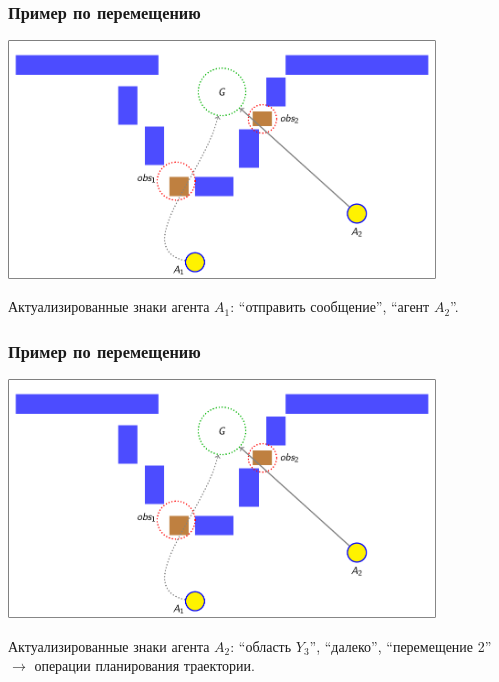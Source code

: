 \documentclass[default]{beamer}
\begin{document}
	\begin{frame}
		\frametitle{Пример по перемещению}
		
		\begin{center}
			\includegraphics[page=42,width=0.85\textwidth]{examples/slides_colored}
		\end{center}
		\par\bigskip
		Актуализированные знаки агента $A_1$: ``отправить сообщение'', ``агент $A_2$''.
	\end{frame}
	
	\begin{frame}
		\frametitle{Пример по перемещению}
		
		\begin{center}
			\includegraphics[page=58,width=0.85\textwidth]{examples/slides_colored}
		\end{center}
		\par\bigskip
		Актуализированные знаки агента $A_2$: ``область $Y_3$'', ``далеко'', ``перемещение 2'' $\rightarrow$ \color{red} операции планирования траектории.
	\end{frame}
	
\end{document}
